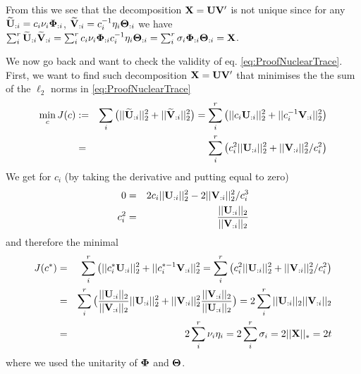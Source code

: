\begin{small}
From this we see that the decomposition $\mathbf{X} = \mathbf{UV'}$ is not unique since for any $\widetilde{\mathbf{U}}_{:i} = c_i \nu_i \mathbf{\Phi}_{:i}$, $\widetilde{\mathbf{V}}_{:i} = c^{-1}_i \eta_i \mathbf{\Theta}_{:i}$ we have $\sum_i^r \widetilde{\mathbf{U}}_{:i} \widetilde{\mathbf{V}}_{:i} = \sum_i^r c_i \nu_i \mathbf{\Phi}_{:i} c^{-1}_i \eta_i \mathbf{\Theta}_{:i} = \sum_i^r \sigma_i \mathbf{\Phi}_{:i} \mathbf{\Theta}_{:i} = \mathbf{X}$.

We now go back and want to check the validity of eq. \eqref{eq:ProofNuclearTrace}.
First, we want to find such decomposition $\mathbf{X} = \mathbf{UV'}$ that minimises the the sum of the $\ell_2$ norms in \eqref{eq:ProofNuclearTrace}
\begin{eqnarray*}
 \min_{c} J(c) & := & \sum_i \big( ||\widetilde{\mathbf{U}}_{:i}||_2^2 + ||\widetilde{\mathbf{V}}_{:i}||_2^2 \big) = \sum_i^r \big( ||c_i \mathbf{U}_{:i}||_2^2 + ||c^{-1}_i \mathbf{V}_{:i}||_2^2 \big) \\ 
& = & \sum_i^r \big( c_i^2 ||\mathbf{U}_{:i}||_2^2 + ||\mathbf{V}_{:i}||_2^2/c_i^2 \big)
\end{eqnarray*}
We get for $c_i$ (by taking the derivative and putting equal to zero)
\begin{eqnarray*}
 0 & = & 2c_i ||\mathbf{U}_{:i}||_2^2 - 2 ||\mathbf{V}_{:i}||_2^2/c_i^3 \\
c_i^2 & = & \frac{||\mathbf{U}_{:i}||_2}{||\mathbf{V}_{:i}||_2}
\end{eqnarray*}
and therefore the minimal 
\begin{eqnarray*}
J(c^*) & = & \sum_i^r \big( ||c_i^* \mathbf{U}_{:i}||_2^2 + ||c^{*-1}_i \mathbf{V}_{:i}||_2^2 = \sum_i^r \big( c_i^2 ||\mathbf{U}_{:i}||_2^2 + ||\mathbf{V}_{:i}||_2^2/c_i^2 \big) \\
& = & \sum_i^r \big( \frac{||\mathbf{U}_{:i}||_2}{||\mathbf{V}_{:i}||_2} ||\mathbf{U}_{:i}||_2^2 + ||\mathbf{V}_{:i}||_2^2 \frac{||\mathbf{V}_{:i}||_2}{||\mathbf{U}_{:i}||_2} \big) 
= 2 \sum_i^r ||\mathbf{U}_{:i}||_2 ||\mathbf{V}_{:i}||_2 \\
& = & 2 \sum_i^r \nu_i \eta_i = 2 \sum_i^r \sigma_i = 2 ||\mathbf{X}||_* = 2t
\end{eqnarray*}
where we used the unitarity of $\mathbf{\Phi}$ and $\mathbf{\Theta}$.
\end{small}

